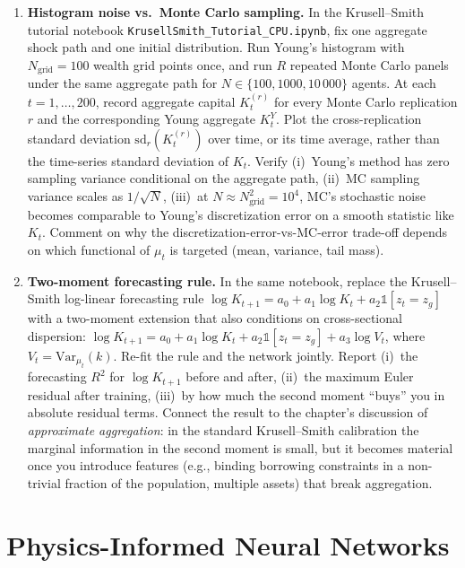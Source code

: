 \documentclass[11pt,a4paper]{report}
\begin{document}
\begin{enumerate}[itemsep=4pt, leftmargin=*]
\item\label{ex:ch6:6} \textbf{Histogram noise vs.\ Monte Carlo sampling.}  In the Krusell--Smith tutorial notebook \texttt{KrusellSmith\_Tutorial\_CPU.ipynb}, fix one aggregate shock path and one initial distribution.  Run Young's histogram with $N_\mathrm{grid} = 100$ wealth grid points once, and run $R$ repeated Monte Carlo panels under the same aggregate path for $N \in \{100, 1000, 10\,000\}$ agents.  At each $t = 1, \dots, 200$, record aggregate capital $K_t^{(r)}$ for every Monte Carlo replication $r$ and the corresponding Young aggregate $K_t^Y$.  Plot the cross-replication standard deviation $\mathrm{sd}_r(K_t^{(r)})$ over time, or its time average, rather than the time-series standard deviation of $K_t$.  Verify (i)~Young's method has zero sampling variance conditional on the aggregate path, (ii)~MC sampling variance scales as $1/\sqrt{N}$, (iii)~at $N \approx N_\mathrm{grid}^2 = 10^4$, MC's stochastic noise becomes comparable to Young's discretization error on a smooth statistic like $K_t$.  Comment on why the discretization-error-vs-MC-error trade-off depends on which functional of $\mu_t$ is targeted (mean, variance, tail mass).
\item\label{ex:ch6:7} \textbf{Two-moment forecasting rule.}  In the same notebook, replace the Krusell--Smith log-linear forecasting rule $\log K_{t+1} = a_0 + a_1 \log K_t + a_2 \mathbb{1}[z_t = z_g]$ with a two-moment extension that also conditions on cross-sectional dispersion: $\log K_{t+1} = a_0 + a_1 \log K_t + a_2 \mathbb{1}[z_t = z_g] + a_3 \log V_t$, where $V_t = \mathrm{Var}_{\mu_t}(k)$.  Re-fit the rule and the network jointly.  Report (i)~the forecasting $R^2$ for $\log K_{t+1}$ before and after, (ii)~the maximum Euler residual after training, (iii)~by how much the second moment ``buys'' you in absolute residual terms.  Connect the result to the chapter's discussion of \emph{approximate aggregation}: in the standard Krusell--Smith calibration the marginal information in the second moment is small, but it becomes material once you introduce features (e.g., binding borrowing constraints in a non-trivial fraction of the population, multiple assets) that break aggregation.
\end{enumerate}

\chapter{Physics-Informed Neural Networks}
\label{ch:pinn}
\end{document}
